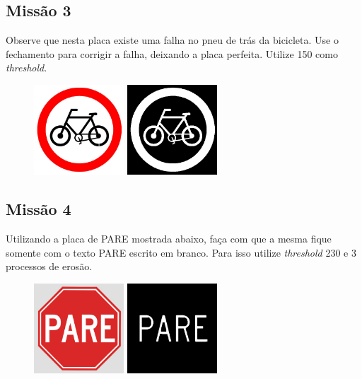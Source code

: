 \documentclass[
	12pt,				%
	oneside,			%
	a4paper,			%
	english,			%
	french,				%
	spanish,			%
	brazil,				%
	]{abntex2}
\begin{document}
\begin{apendicesenv}
\subsection{Missão 3}

Observe que nesta placa existe uma falha no pneu de trás da bicicleta. Use o fechamento para corrigir a falha, deixando a placa perfeita. Utilize 150 como \textit{threshold}.

\begin{figure}[H]
\centering
\includegraphics[width=0.3\textwidth]{imagens/transito/mission3_input.jpg}
\includegraphics[width=0.3\textwidth]{imagens/transito/mission3_output.png}
\end{figure}

\subsection{Missão 4}

Utilizando a placa de PARE mostrada abaixo, faça com que a mesma fique somente com o texto PARE escrito em branco. Para isso utilize \textit{threshold} 230 e 3 processos de erosão.

\begin{figure}[H]
\centering
\includegraphics[width=0.3\textwidth]{imagens/transito/mission4_input.jpg}
\includegraphics[width=0.3\textwidth]{imagens/transito/mission4_output.png}
\end{figure}


\end{apendicesenv}


\printindex
\end{document}
